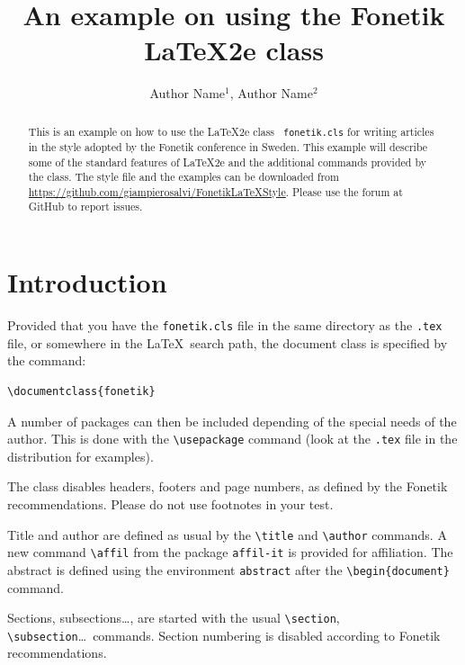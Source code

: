 \documentclass{fonetik}
\title{An example on using the Fonetik \LaTeX2e class}
\author{Author Name$^1$, Author Name$^2$}
\affil{$^1$KTH Royal Institute of Technology,\\
  $^2$Department, University, Country\\
  \normalfont\texttt{author@kth.se, author@dept.uni.co}
}
\begin{document}
\maketitle

\begin{abstract}
This is an example on how to use the \LaTeX2e class {\tt
  fonetik.cls} for writing articles in the style adopted by the Fonetik
conference in Sweden. This example will describe some of the standard features
of \LaTeX2e and the additional commands provided by the class.
The style file and the examples can be downloaded from
\url{https://github.com/giampierosalvi/FonetikLaTeXStyle}.
Please use the forum at GitHub to report issues.
\end{abstract}

\section{Introduction}
Provided that you have the \verb|fonetik.cls| file in the same directory
as the \verb|.tex| file, or somewhere in the \LaTeX\ search path, the
document class is specified by the command:
\begin{verbatim}
\documentclass{fonetik}
\end{verbatim}

A number of packages can then be included depending of the special
needs of the author. This is done with the \verb|\usepackage| command
(look at the \verb|.tex| file in the distribution for examples).

The class disables headers, footers and page numbers, as defined by the
Fonetik recommendations. Please do not use footnotes in your test.

Title and author are defined as usual by the \verb|\title| and
\verb|\author| commands. A new command \verb|\affil| from the package
\verb|affil-it| is provided for affiliation. The abstract is defined using
the environment \verb|abstract| after the \verb|\begin{document}|
command.

Sections, subsections\ldots, are started with the usual
\verb|\section|, \verb|\subsection|\ldots\ commands. Section numbering is
disabled according to Fonetik recommendations.
\end{document}
